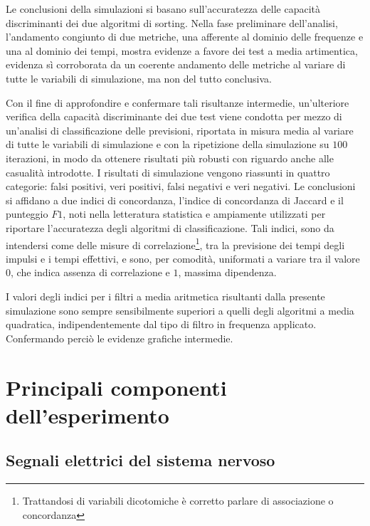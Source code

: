 Le conclusioni della simulazioni si basano sull'accuratezza delle capacità discriminanti dei due algoritmi di sorting. Nella fase preliminare dell'analisi, l'andamento congiunto di due metriche, una afferente al dominio delle frequenze e una al dominio dei tempi, mostra evidenze a favore dei test a media artimentica, evidenza sì corroborata da un coerente andamento delle metriche al variare di tutte le variabili di simulazione, ma non del tutto conclusiva.

Con il fine di approfondire e confermare tali risultanze intermedie, un'ulteriore verifica della capacità discriminante dei due test viene condotta per mezzo di un'analisi di classificazione delle previsioni, riportata in misura media al variare di tutte le variabili di simulazione e con la ripetizione della simulazione su $100$ iterazioni, in modo da ottenere risultati più robusti con riguardo anche alle casualità introdotte. I risultati di simulazione vengono riassunti in quattro categorie: falsi positivi, veri positivi, falsi negativi e veri negativi. Le conclusioni si affidano a due indici di concordanza, l'indice di concordanza di Jaccard e il punteggio $F1$, noti nella letteratura statistica e ampiamente utilizzati per riportare l'accuratezza degli algoritmi di classificazione. Tali indici, sono da intendersi come delle misure di correlazione\footnote{Trattandosi di variabili dicotomiche è corretto parlare di associazione o concordanza}, tra la previsione dei tempi degli impulsi e i tempi effettivi, e sono, per comodità, uniformati a variare tra il valore $0$, che indica assenza di correlazione e $1$, massima dipendenza. 

I valori degli indici per i filtri a media aritmetica risultanti dalla presente simulazione sono sempre sensibilmente superiori a quelli degli algoritmi a media quadratica, indipendentemente dal tipo di filtro in frequenza applicato. Confermando perciò le evidenze grafiche intermedie.




\section{Principali componenti dell'esperimento}




\subsection{Segnali elettrici del sistema nervoso}

